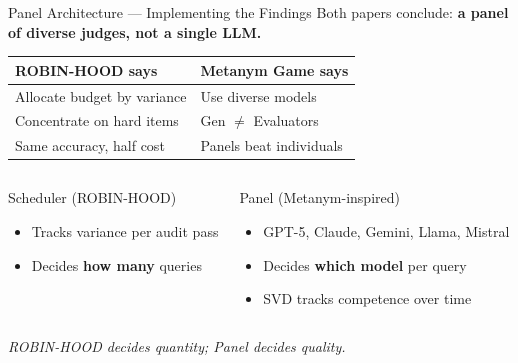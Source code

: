 \documentclass[11pt, aspectratio=169]{beamer}
\begin{document}
\begin{frame}{Panel Architecture --- Implementing the Findings}
  \centering
  Both papers conclude: \textbf{a panel of diverse judges, not a single LLM.}

  \vspace{0.15cm}
  {\footnotesize
  \begin{tabularx}{\textwidth}{X X}
    \toprule
    \textbf{ROBIN-HOOD says} & \textbf{Metanym Game says} \\
    \midrule
    Allocate budget by variance & Use diverse models \\
    Concentrate on hard items   & Gen $\neq$ Evaluators \\
    Same accuracy, half cost    & Panels beat individuals \\
    \bottomrule
  \end{tabularx}
  }

  \vspace{0.15cm}
  \begin{columns}[T]
      \begin{block}{Scheduler (ROBIN-HOOD)}
        \begin{itemize}\footnotesize
          \item Tracks variance per audit pass
          \item Decides \textbf{how many} queries
        \end{itemize}
      \end{block}

      \begin{block}{Panel (Metanym-inspired)}
        \begin{itemize}\footnotesize
          \item GPT-5, Claude, Gemini, Llama, Mistral
          \item Decides \textbf{which model} per query
          \item SVD tracks competence over time
        \end{itemize}
      \end{block}
  \end{columns}

  \vspace{0.1cm}
  {\footnotesize\textit{ROBIN-HOOD decides quantity; Panel decides quality.}}
\end{frame}
\end{document}
